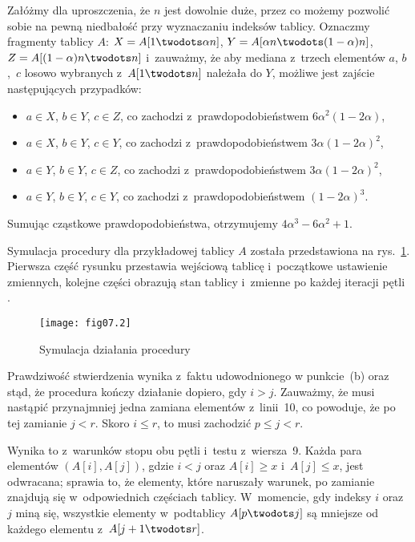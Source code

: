 \exercise %
Załóżmy dla uproszczenia, że $n$ jest dowolnie duże, przez co możemy pozwolić sobie na pewną niedbałość przy wyznaczaniu indeksów tablicy. Oznaczmy fragmenty tablicy $A$: $X=A[1\twodots\alpha n]$, $Y=A[\alpha n\twodots(1-\alpha)n]$, $Z=A[(1-\alpha)n\twodots n]$ i~zauważmy, że aby mediana z~trzech elementów $a$, $b$,~$c$ losowo wybranych z~$A[1\twodots n]$ należała do $Y$, możliwe jest zajście następujących przypadków:
\begin{itemize}
	\item $a\in X$, $b\in Y$, $c\in Z$, co zachodzi z~prawdopodobieństwem $6\alpha^2(1-2\alpha)$,
	\item $a\in X$, $b\in Y$, $c\in Y$, co zachodzi z~prawdopodobieństwem $3\alpha(1-2\alpha)^2$,
	\item $a\in Y$, $b\in Y$, $c\in Z$, co zachodzi z~prawdopodobieństwem $3\alpha(1-2\alpha)^2$,
	\item $a\in Y$, $b\in Y$, $c\in Y$, co zachodzi z~prawdopodobieństwem $(1-2\alpha)^3$.
\end{itemize}
Sumując cząstkowe prawdopodobieństwa, otrzymujemy $4\alpha^3-6\alpha^2+1$.

\problems


\subproblem %
Symulacja procedury  dla przykładowej tablicy $A$ została przedstawiona na rys.~\ref{fig:7-1a}. Pierwsza część rysunku przestawia wejściową tablicę i~początkowe ustawienie zmiennych, kolejne części obrazują stan tablicy i~zmienne po każdej iteracji pętli .
\begin{figure}[!h]
	\begin{center}
		\texttt{[image: fig07.2]}
	\end{center}
	\caption{Symulacja działania procedury } \label{fig:7-1a}
\end{figure}

\subproblem %

\subproblem %
Prawdziwość stwierdzenia wynika z~faktu udowodnionego w punkcie~(b) oraz stąd, że procedura kończy działanie dopiero, gdy $i>j$. Zauważmy, że musi nastąpić przynajmniej jedna zamiana elementów z~linii~10, co powoduje, że po tej zamianie $j<r$. Skoro $i\le r$, to musi zachodzić $p\le j<r$.

\subproblem %
Wynika to z~warunków stopu obu pętli  i~testu z~wiersza~9. Każda para elementów $(A[i],A[j])$, gdzie $i<j$ oraz $A[i]\ge x$ i~$A[j]\le x$, jest odwracana; sprawia to, że elementy, które naruszały warunek, po zamianie znajdują się w~odpowiednich częściach tablicy. W~momencie, gdy indeksy $i$ oraz $j$ miną się, wszystkie elementy w~podtablicy $A[p\twodots j]$ są mniejsze od każdego elementu z~$A[j+1\twodots r]$.

